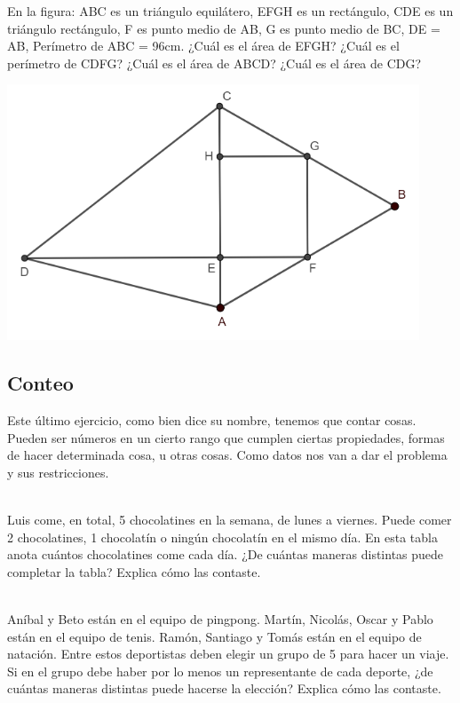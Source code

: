 \documentclass{article}
\begin{document}
\begin{ejemplo}
En la figura:
ABC es un triángulo equilátero,
EFGH es un rectángulo,
CDE es un triángulo rectángulo,
F es punto medio de AB,
G es punto medio de BC,
DE = AB,
Perímetro de ABC = 96cm.
¿Cuál es el área de EFGH?
¿Cuál es el perímetro de CDFG?
¿Cuál es el área de ABCD?
¿Cuál es el área de CDG?

\includegraphics[scale=0.6]{geometry-example-2}
\end{ejemplo}

\subsection{Conteo}
\begin{small}
Este último ejercicio, como bien dice su nombre, tenemos que contar cosas. Pueden ser números en un cierto rango que cumplen ciertas propiedades, formas de hacer determinada cosa, u otras cosas. Como datos nos van a dar el problema y sus restricciones.
\\
\\
\end{small}

\begin{ejemplo}
Luis come, en total, 5 chocolatines en la semana, de lunes a viernes.
Puede comer 2 chocolatines, 1 chocolatín o ningún chocolatín en el mismo día.
En esta tabla anota cuántos chocolatines come cada día.
¿De cuántas maneras distintas puede completar la tabla?
Explica cómo las contaste.
\\
\\
\end{ejemplo}

\begin{ejemplo}
Aníbal y Beto están en el equipo de pingpong.
Martín, Nicolás, Oscar y Pablo están en el equipo de tenis.
Ramón, Santiago y Tomás están en el equipo de natación.
Entre estos deportistas deben elegir un grupo de 5 para hacer un viaje.
Si en el grupo debe haber por lo menos un representante de cada deporte,
¿de cuántas maneras distintas puede hacerse la elección?
Explica cómo las contaste.

\end{ejemplo}
\end{document}
